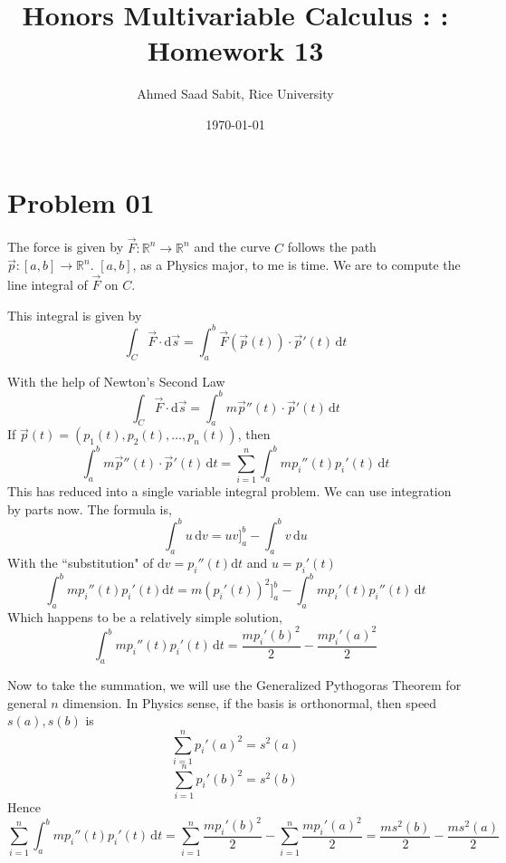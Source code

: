 \documentclass[letter]{article}
\title{Honors Multivariable Calculus : : Homework 13}
\author{Ahmed Saad Sabit, Rice University}
\date{\today}
\begin{document}
\maketitle
\section*{Problem 01} 
The force is given by $\vec{F}: \mathbb{R}^{n} \to  \mathbb{R}^{n}$ and the curve $C$ follows the path $\vec{p} : [a,b] \to \mathbb{R}^{n}$. $[a,b]$, as a Physics major, to me is time. We are to compute the line integral of $\vec{F}$ on $C$. 

This integral is given by 
\[
\int_C \vec{F} \cdot \mathrm{d} \vec{s} = \int_a^b \vec{F}(\vec{p}(t)) \cdot \vec{p}'(t) \, \mathrm{d} t
\]

With the help of Newton's Second Law 
\[
\int_C \vec{F} \cdot \mathrm{d} \vec{s} = \int_a^b m \vec{p}''(t)\cdot \vec{p}'(t) \, \mathrm{d} t
\] 
If $\vec{p}(t) = \left(p_1(t), p_2(t), \ldots, p_n(t)\right)$, then 
\[
\int_a^b m \vec{p}''(t)\cdot \vec{p}'(t) \, \mathrm{d} t = 
\sum_{i=1}^{n} \int_a^b m p_i'' (t) p_i ' (t) \, \mathrm{d} t
\] 
This has reduced into a single variable integral problem. We can use integration by parts now. The formula is, 
\[
	\int_a^b u \,\mathrm{d} v  = uv]_{a}^b - \int_{a}^{b} v \, \mathrm{d} u 
\]
With the ``substitution" of $\mathrm{d} v = p_i ''(t) \mathrm{d}  t$ and $u = p_i'(t)$
\[
	\int_a^b m p_i '' (t) p_i '(t) \mathrm{d} t = m (p_i'(t))^2 ]_a^b- \int_a^b m p_i'(t) p_i ''(t) \, \mathrm{d}  t
\] Which happens to be a relatively simple solution,
\[
	\int_{a}^{b}  m p_i''(t) p_i '(t) \, \mathrm{d}  t= \frac{m p_i'(b)^2}{2} - \frac{m p_i'(a)^2}{2} 
\]

Now to take the summation, we will use the Generalized Pythogoras Theorem for general $n$ dimension.
In Physics sense, if the basis is orthonormal, then speed $s(a), s(b)$ is 
\[
\sum_{i = 1}^{n} p_i' (a)^2 = s ^2(a)
\] 
\[
\sum_{i = 1}^{n} p_i' (b)^2 = s ^2(b)
\] Hence
\[
\sum_{i = 1}^{n}\int_{a}^{b}   m p_i''(t) p_i'(t) \, \mathrm{d} t
= 
\sum_{i = 1}^{n} \frac{m p_i'(b)^2}{2} - \sum_{i=1}^{n} \frac{m p_i '(a)^2}{2} = \frac{ms ^2(b)}{2} - \frac{m s ^2(a) }{2}
\]
\end{document}
